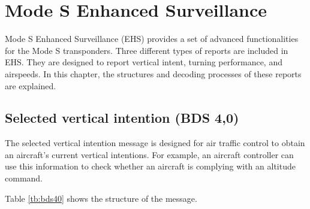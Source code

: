 \chapter{Mode S Enhanced Surveillance}

Mode S Enhanced Surveillance (EHS) provides a set of advanced functionalities for the Mode S transponders. Three different types of reports are included in EHS. They are designed to report vertical intent, turning performance, and airspeeds. In this chapter, the structures and decoding processes of these reports are explained.

\section{Selected vertical intention (BDS 4,0)}

The selected vertical intention message is designed for air traffic control to obtain an aircraft's current vertical intentions. For example, an aircraft controller can use this information to check whether an aircraft is complying with an altitude command. 

Table \ref{tb:bds40} shows the structure of the message.

